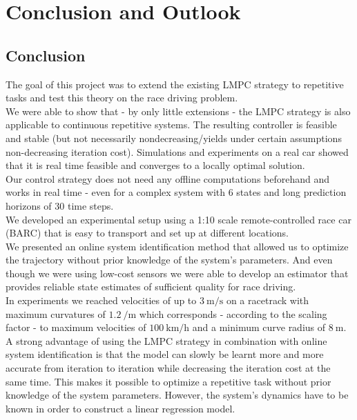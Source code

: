 \chapter{Conclusion and Outlook}

\section{Conclusion}
The goal of this project was to extend the existing LMPC strategy to repetitive tasks and test this theory on the race driving problem.\\
We were able to show that - by only little extensions - the LMPC strategy is also applicable to continuous repetitive systems. The resulting controller is feasible and stable (but not necessarily nondecreasing/yields under certain assumptions non-decreasing iteration cost). Simulations and experiments on a real car showed that it is real time feasible and converges to a locally optimal solution.\\
Our control strategy does not need any offline computations beforehand and works in real time - even for a complex system with 6 states and long prediction horizons of 30 time steps.\\
We developed an experimental setup using a 1:10 scale remote-controlled race car (BARC) that is easy to transport and set up at different locations.\\
We presented an online system identification method that allowed us to optimize the trajectory without prior knowledge of the system's parameters. And even though we were using low-cost sensors we were able to develop an estimator that provides reliable state estimates of sufficient quality for race driving.\\
In experiments we reached velocities of up to $\SI{3}{\meter\per\second}$ on a racetrack with maximum curvatures of $\SI{1.2}{\per\meter}$ which corresponds - according to the scaling factor - to maximum velocities of $\SI{100}{\kilo\meter\per\hour}$ and a minimum curve radius of $\SI{8}{\meter}$.\\
A strong advantage of using the LMPC strategy in combination with online system identification is that the model can slowly be learnt more and more accurate from iteration to iteration while decreasing the iteration cost at the same time. This makes it possible to optimize a repetitive task without prior knowledge of the system parameters. However, the system's dynamics have to be known in order to construct a linear regression model.
